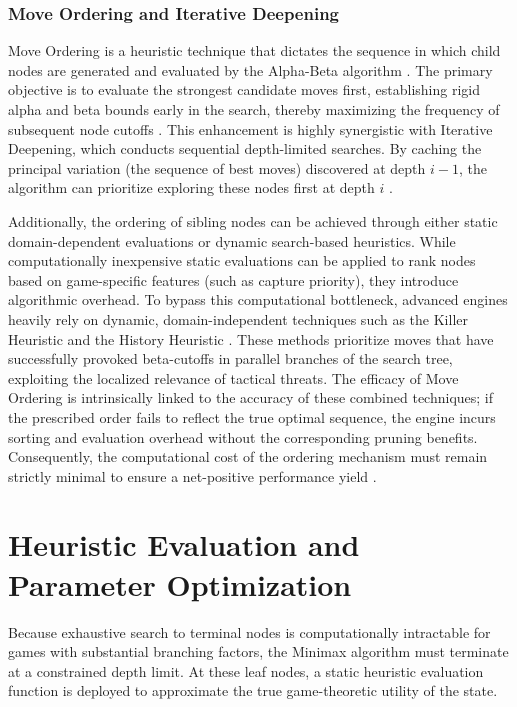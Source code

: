 \subsubsection{Move Ordering and Iterative Deepening}
Move Ordering is a heuristic technique that dictates the sequence in which child nodes are generated and evaluated by the Alpha-Beta algorithm \cite{Artificial_intelligence, brange2021evaluating}. The primary objective is to evaluate the strongest candidate moves first, establishing rigid alpha and beta bounds early in the search, thereby maximizing the frequency of subsequent node cutoffs \cite{brange2021evaluating}. This enhancement is highly synergistic with Iterative Deepening, which conducts sequential depth-limited searches. By caching the principal variation (the sequence of best moves) discovered at depth $i-1$, the algorithm can prioritize exploring these nodes first at depth $i$ \cite{schaeffer1996new, 8111328d35084c87b0b0fcdbe77ef02e}.

Additionally, the ordering of sibling nodes can be achieved through either static domain-dependent evaluations or dynamic search-based heuristics. While computationally inexpensive static evaluations can be applied to rank nodes based on game-specific features (such as capture priority), they introduce algorithmic overhead. To bypass this computational bottleneck, advanced engines heavily rely on dynamic, domain-independent techniques such as the Killer Heuristic and the History Heuristic \cite{Artificial_intelligence}. These methods prioritize moves that have successfully provoked beta-cutoffs in parallel branches of the search tree, exploiting the localized relevance of tactical threats. The efficacy of Move Ordering is intrinsically linked to the accuracy of these combined techniques; if the prescribed order fails to reflect the true optimal sequence, the engine incurs sorting and evaluation overhead without the corresponding pruning benefits. Consequently, the computational cost of the ordering mechanism must remain strictly minimal to ensure a net-positive performance yield \cite{brange2021evaluating, 8111328d35084c87b0b0fcdbe77ef02e}.

\section{Heuristic Evaluation and Parameter Optimization}

Because exhaustive search to terminal nodes is computationally intractable for games with substantial branching factors, the Minimax algorithm must terminate at a constrained depth limit. At these leaf nodes, a static heuristic evaluation function is deployed to approximate the true game-theoretic utility of the state.

